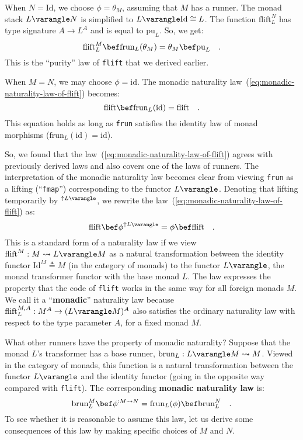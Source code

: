 When $N=\text{Id}$, we choose $\phi=\theta_{M}$, assuming that $M$
has a runner. The monad stack $L\varangle N$ is simplified to $L\varangle\text{Id}\cong L$.
The function $\text{flift}_{L}^{N}$ has type signature $A\rightarrow L^{A}$
and is equal to $\text{pu}_{L}$. So, we get:
\[
\text{flift}_{L}^{M}\bef\text{frun}_{L}(\theta_{M})=\theta_{M}\bef\text{pu}_{L}\quad.
\]
This is the \textsf{``}purity\textsf{''} law of \lstinline!flift! that we derived
earlier.

When $M=N$, we may choose $\phi=\text{id}$. The monadic naturality
law~(\ref{eq:monadic-naturality-law-of-flift}) becomes:
\[
\text{flift}\bef\text{frun}_{L}(\text{id})=\text{flift}\quad.
\]
This equation holds as long as \lstinline!frun! satisfies the identity
law of monad morphisms ($\text{frun}_{L}(\text{id})=\text{id}$).

So, we found that the law~(\ref{eq:monadic-naturality-law-of-flift})
agrees with previously derived laws and also covers one of the laws
of runners. The interpretation of the monadic naturality law becomes
clear from viewing \lstinline!frun! as a lifting (\textsf{``}\lstinline!fmap!\textsf{''})
corresponding to the functor $L\varangle$. Denoting that lifting
temporarily by $^{\uparrow L\varangle}$, we rewrite the law~(\ref{eq:monadic-naturality-law-of-flift})
as:
\[
\text{flift}\bef\phi^{\uparrow L\varangle}=\phi\bef\text{flift}\quad.
\]
This is a standard form of a naturality law if we view $\text{flift}^{M}:M\leadsto L\varangle M$
as a natural
transformation between the identity functor $\text{Id}^{M}\triangleq M$
(in the category of monads) to the functor $L\varangle$, the monad
transformer functor with the base monad $L$. The law expresses the
property that the code of \lstinline!flift! works in the same way
for all foreign monads $M$. We call it a \textsf{``}\textbf{monadic}\textsf{''} naturality
law
because $\text{flift}_{L}^{M,A}:M^{A}\rightarrow(L\varangle M)^{A}$
also satisfies the ordinary naturality law with respect to the type
parameter $A$, for a fixed monad $M$.

What other runners have the property of monadic naturality? Suppose
that the monad $L$\textsf{'}s transformer has a base runner, $\text{brun}_{L}:L\varangle M\leadsto M$.
Viewed in the category of monads, this function is a natural transformation
between the functor $L\varangle$ and the identity functor (going
in the opposite way compared with \lstinline!flift!). The corresponding
\textbf{monadic naturality law}
is:
\[
\text{brun}_{L}^{M}\bef\phi^{:M\leadsto N}=\text{frun}_{L}(\phi)\bef\text{brun}_{L}^{N}\quad.
\]
To see whether it is reasonable to assume this law, let us derive
some consequences of this law by making specific choices of $M$ and
$N$.

